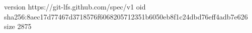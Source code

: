 version https://git-lfs.github.com/spec/v1
oid sha256:8aec17d77467d3718576f6068205712351b6050eb8f1c24dbd76eff4adb7e626
size 2875
